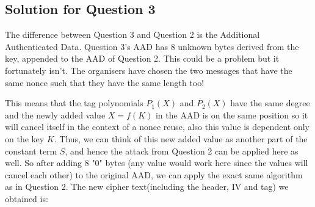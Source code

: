 \documentclass[11pt]{llncs}
\begin{document}
\newpage
\subsection{Solution for Question 3}

The difference between Question 3 and Question 2 is the Additional Authenticated Data. Question 3's AAD has $8$ unknown bytes derived from the key, appended to the AAD of Question 2. This could be a problem but it fortunately isn't. The organisers have chosen the two messages that have the same nonce such that they have the same length too! 

This means that the tag polynomials $P_1(X)$ and $P_2(X)$ have the same degree and the newly added value $X = f(K)$ in the AAD is on the same position so it will cancel itself in the context of a nonce reuse, also this value is dependent only on the key $K$. Thus, we can think of this new added value as another part of the constant term $S$, and hence the attack from Question 2 can be applied here as well. So after adding 8 "0" bytes (any value would work here since the values will cancel each other) to the original AAD, we can apply the exact same algorithm as in Question 2.
The new cipher text(including the header, IV and tag) we obtained is:
\end{document}
